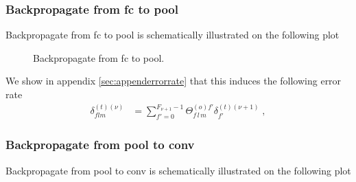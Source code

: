 \subsubsection{Backpropagate from fc to pool}

Backpropagate from fc to pool is schematically illustrated on the following plot

\begin{figure}[H]
\begin{center}
\caption{Backpropagate from fc to pool.}
\end{center}
\end{figure}
We show in appendix \ref{sec:appenderrorrate} that this induces the following error rate
\begin{align}
\delta^{(t)(\nu)}_{flm}&=\sum_{f'=0}^{F_{\nu+1}-1}\Theta^{(o)f'}_{f\,l\,m} \delta^{(t)(\nu+1)}_{f'}\;,
\end{align}

\subsubsection{Backpropagate from pool to conv}

Backpropagate from pool to conv is schematically illustrated on the following plot

